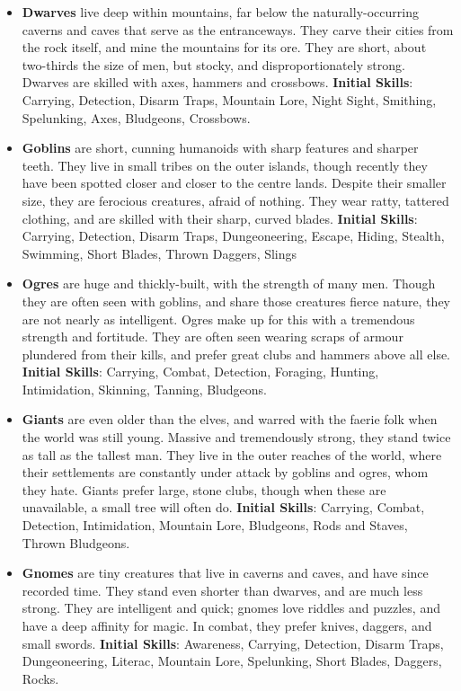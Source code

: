 \begin{itemize}
\item {\bf Dwarves} live deep within mountains, far below the 
naturally-occurring caverns and caves that serve as the entranceways.  They
carve their cities from the rock itself, and mine the mountains for its 
ore.  They are short, about two-thirds the size of men, but stocky, and 
disproportionately strong.  Dwarves are skilled with axes, hammers and 
crossbows. \textbf{Initial Skills}: Carrying, Detection, Disarm Traps,
Mountain Lore, Night Sight, Smithing, Spelunking, Axes, Bludgeons,
Crossbows.

\item {\bf Goblins} are short, cunning humanoids with sharp features and 
sharper teeth.  They live in small tribes on the outer islands, though 
recently they have been spotted closer and closer to the centre lands.   
Despite their smaller size, they are ferocious creatures, afraid of 
nothing.  They wear ratty, tattered clothing, and are skilled with their 
sharp, curved blades. \textbf{Initial Skills}: Carrying, Detection,
Disarm Traps, Dungeoneering, Escape, Hiding, Stealth, Swimming, Short
Blades, Thrown Daggers, Slings

\item {\bf Ogres} are huge and thickly-built, with the strength of many 
men.  Though they are often seen with goblins, and share those creatures 
fierce nature, they are not nearly as intelligent.  Ogres make up for this 
with a tremendous strength and fortitude.  They are often seen wearing 
scraps of armour plundered from their kills, and prefer great clubs and 
hammers above all else. \textbf{Initial Skills}: Carrying, Combat,
Detection, Foraging, Hunting, Intimidation, Skinning, Tanning, Bludgeons.

\item {\bf Giants} are even older than the elves, and warred with the 
faerie folk when the world was still young.  Massive and tremendously 
strong, they stand twice as tall as the tallest man.  They live in the 
outer reaches of the world, where their settlements are constantly under 
attack by goblins and ogres, whom they hate. Giants prefer large, stone 
clubs, though when these are unavailable, a small tree will often do.
\textbf{Initial Skills}: Carrying, Combat, Detection, Intimidation,
Mountain Lore, Bludgeons, Rods and Staves, Thrown Bludgeons.

\item {\bf Gnomes} are tiny creatures that live in caverns and caves, and 
have since recorded time.  They stand even shorter than dwarves, and are 
much less strong.  They are intelligent and quick; gnomes love riddles and 
puzzles, and have a deep affinity for magic.  In combat, they prefer knives,
daggers, and small swords. \textbf{Initial Skills}: Awareness, Carrying,
Detection, Disarm Traps, Dungeoneering, Literac, Mountain Lore, Spelunking,
Short Blades, Daggers, Rocks.
\end{itemize}

